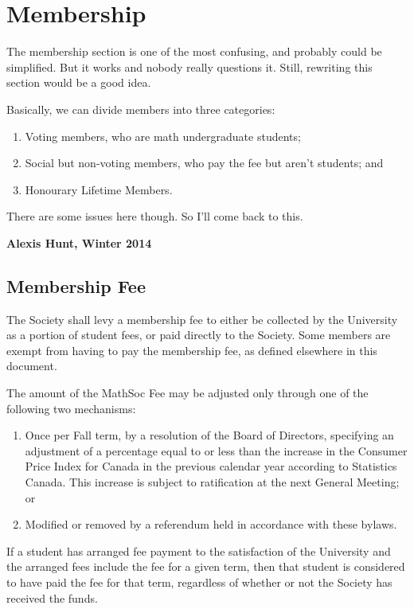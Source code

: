 \section{Membership}
\begin{annotation}
The membership section is one of the most confusing, and probably could be
simplified. But it works and nobody really questions it. Still, rewriting this
section would be a good idea.

Basically, we can divide members into three categories:
\begin{enumerate}
  \item Voting members, who are math undergraduate students;
  \item Social but non-voting members, who pay the fee but aren't students; and
  \item Honourary Lifetime Members.
\end{enumerate}
There are some issues here though. So I'll come back to this.

\textbf{Alexis Hunt, Winter 2014}
\end{annotation}

\subsection{Membership Fee}

The Society shall levy a membership fee to either be collected by the University
as a portion of student fees, or paid directly to the Society. Some members are
exempt from having to pay the membership fee, as defined elsewhere in this
document.

The amount of the MathSoc Fee may be adjusted only through one of the following two mechanisms:
\begin{enumerate}
    \item Once per Fall term, by a resolution of the Board of Directors,
        specifying an adjustment of a percentage equal to or less than the
        increase in the Consumer Price Index for Canada in the previous
        calendar year according to Statistics Canada. This increase is subject
        to ratification at the next General Meeting; or 
    \item Modified or removed by a referendum held in accordance with these
        bylaws.
\end{enumerate}

If a student has arranged fee payment to the satisfaction of the University and
the arranged fees include the fee for a given term, then that student is
considered to have paid the fee for that term, regardless of whether or not the
Society has received the funds.

